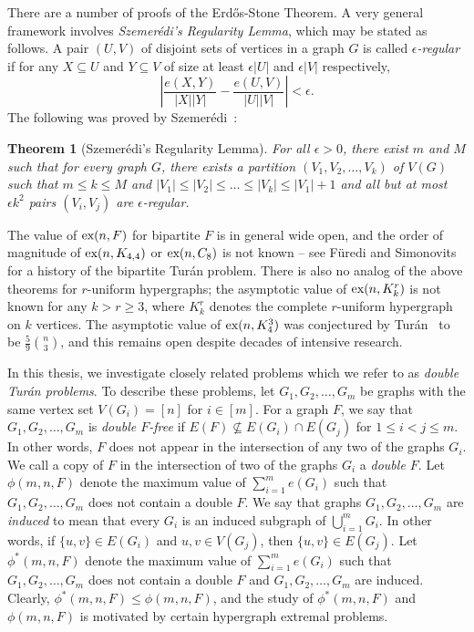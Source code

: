 \documentclass[12pt]{article}
\newcounter{foo}
\newtheorem{oldtheorem}[foo]{Theorem}
\newcommand*{\ex}{\textnormal{ex}}
\begin{document}
There are a number of proofs of the Erd\H{o}s-Stone Theorem. A very general framework involves \textit{Szemer\'{e}di's Regularity Lemma}, which may be stated as follows. A pair $(U,V)$ of disjoint sets of vertices in a graph $G$ is called \textit{$\epsilon$-regular} if for any $X \subseteq U$ and $Y \subseteq V$ of size at least $\epsilon |U|$ and $\epsilon|V|$ respectively, 
\[
  \left|\frac{e(X, Y)}{|X||Y|} - \frac{e(U, V)}{|U||V|}\right| < \epsilon.
\]
The following was proved by Szemer\'{e}di~\cite{Szemeredi1978}:

\begin{oldtheorem} [Szemer\'{e}di's Regularity Lemma]
For all $\epsilon > 0$, there exist $m$ and $M$ such that for every graph $G$, there exists a partition $(V_1, V_2, \dots, V_k)$ of $V(G)$ such that $m \leq k \leq M$ and $|V_1| \leq |V_2| \leq \dots \leq |V_k| \leq |V_1| + 1$ and all but at most $\epsilon k^2$ pairs $(V_i, V_j)$ are $\epsilon$-regular. 
\end{oldtheorem}

The value of $\ex(n, F)$ for bipartite $F$ is in general wide open, and the order of magnitude of $\ex(n, K_{4, 4})$ or $\ex(n, C_8)$ is not known -- see F\"{u}redi and Simonovits~\cite{FurediSimonovits2013} for a history of the bipartite Tur\'{a}n problem. There is also no analog of the above theorems for $r$-uniform hypergraphs; the asymptotic value of $\ex(n, K_k^r)$ is not known for any $k > r \geq 3$, where $K_k^r$ denotes the complete $r$-uniform hypergraph on $k$ vertices. The asymptotic value of $\ex(n, K_4^3)$ was conjectured by Tur\'{a}n~\cite{Turan1941} to be $\frac{5}{9} \binom{n}{3}$, and this remains open despite decades of intensive research. 

In this thesis, we investigate closely related problems which we refer to as \textit{double Tur\'{a}n problems}. To describe these problems, let $G_1, G_2, \ldots, G_m$ be graphs with the same vertex set $V(G_i) = [n]$ for $i \in [m]$. For a graph $F$, we say that $G_1, G_2, \dots, G_m$ is \textit{double $F$-free} if $E(F) \not \subseteq E(G_i) \cap E(G_j)$ for $1 \leq i < j \leq m$. In other words, $F$ does not appear in the intersection of any two of the graphs $G_i$. We call a copy of $F$ in the intersection of two of the graphs $G_i$ a \textit{double $F$}. Let $\phi(m, n, F)$ denote the maximum value of $\sum_{i = 1}^m e(G_i)$ such that $G_1, G_2, \dots, G_m$ does not contain a double $F$. We say that graphs $G_1, G_2, \dots, G_m$ are \textit{induced} to mean that every $G_i$ is an induced subgraph of $\bigcup_{i = 1}^m G_i$. In other words, if $\{u,v\} \in E(G_i)$ and $u,v \in V(G_j)$, then $\{u,v\} \in E(G_j)$. Let $\phi^*(m, n, F)$ denote the maximum value of $\sum_{i = 1}^m e(G_i)$ such that $G_1, G_2, \dots, G_m$ does not contain a double $F$ and $G_1, G_2,\dots, G_m$ are induced. Clearly, $\phi^*(m, n, F) \leq \phi(m, n, F)$, and the study of $\phi^*(m, n, F)$ and $\phi(m, n,F )$ is motivated by certain hypergraph extremal problems.
\end{document}
